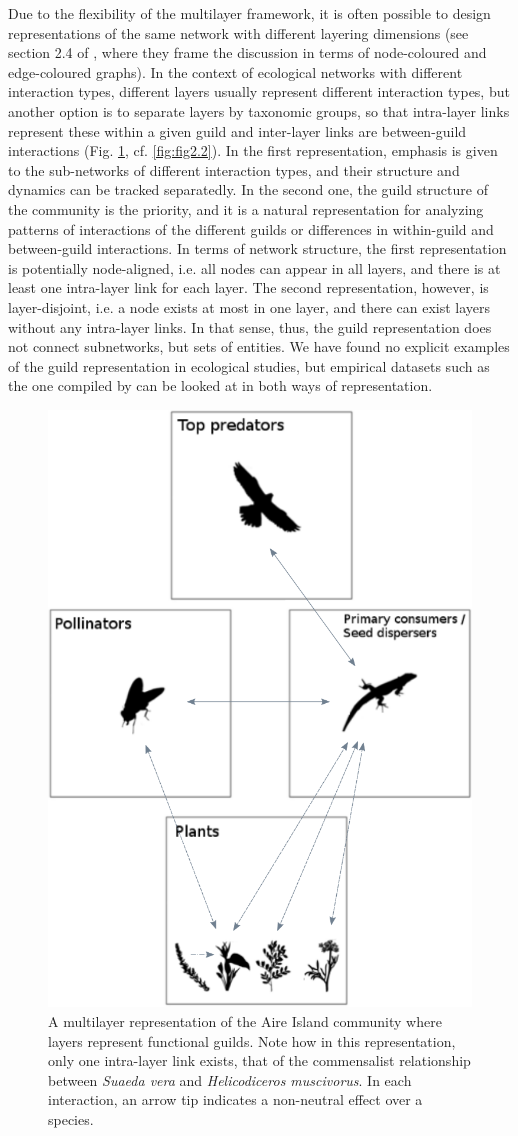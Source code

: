 Due to the flexibility of the multilayer framework, it is often possible to design representations of the same network with different layering dimensions (see section 2.4 of \cite{Kivela2014}, where they frame the discussion in terms of node-coloured and edge-coloured graphs). In the context of ecological networks with different interaction types, different layers usually represent different interaction types, but another option is to separate layers by taxonomic groups, so that intra-layer links represent these within a given guild and inter-layer links are between-guild interactions (Fig. \ref{fig:figApp2.2.2}, cf. \cref{fig:fig2.2}). In the first representation, emphasis is given to the sub-networks of different interaction types, and their structure and dynamics can be tracked separatedly. In the second one, the guild structure of the community is the priority, and it is a natural representation for analyzing patterns of interactions of the different guilds or differences in within-guild and between-guild interactions. In terms of network structure, the first representation is potentially node-aligned, i.e. all nodes can appear in all layers, and there is at least one intra-layer link for each layer. The second representation, however, is layer-disjoint, i.e. a node exists at most in one layer, and there can exist layers without any intra-layer links. In that sense, thus, the guild representation does not connect subnetworks, but sets of entities. We have found no explicit examples of the guild representation in ecological studies, but empirical datasets such as the one compiled by \citep{Pocock2012} can be looked at in both ways of representation.

\begin{figure}[ht]
\centering
\includegraphics[width=.5\textwidth]{./Figures/Appendix2_2/MLN_alternative.png}
\caption[Multilayer functional guilds]{\color{Gray} A multilayer representation of the Aire Island community where layers represent functional guilds. Note how in this representation, only one intra-layer link exists, that of the commensalist relationship between \textit{Suaeda vera} and \textit{Helicodiceros muscivorus}. In each interaction, an arrow tip indicates a non-neutral effect over a species.}
\label{fig:figApp2.2.2}
\end{figure}

